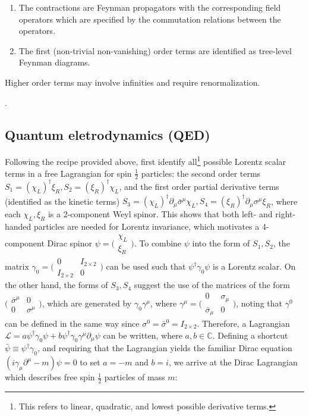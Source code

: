 {\begin{enumerate}
        \item The contractions are Feynman propagators with the
            corresponding field operators which are specified by the commutation
            relations between the operators.

        \item The first (non-trivial non-vanishing) order terms are identified
            as tree-level Feynman diagrams.
    \end{enumerate}
    Higher order terms may involve infinities and require renormalization.
}.


\subsection{Quantum eletrodynamics (QED)}
\label{qed}

Following the recipe provided above, first identify all\footnote{
    This refers to linear, quadratic, and lowest possible derivative terms.
} possible Lorentz scalar
terms in a free Lagrangian for spin $\frac{1}{2}$ particles:
the second order terms
$S_1 = (\chi_L)^\dagger \xi_R, S_2 = (\xi_R)^\dagger\chi_L$,
and the first order partial derivative terms (identified as the kinetic terms)
$S_3 = (\chi_L)^\dagger \partial_\mu \bar{\sigma}^\mu \chi_L,
S_4 = (\xi_R)^\dagger \partial_\mu {\sigma}^\mu \xi_R$,
where each $\chi_L, \xi_R$ is a 2-component Weyl spinor.
This shows that both left- and right-handed particles are needed for Lorentz
invariance,
which motivates a 4-component Dirac spinor
$\psi = \bigl(\begin{smallmatrix} \chi_L \\ \xi_R \end{smallmatrix}\bigr)$.
To combine $\psi$ into the form of $S_1, S_2$,
the matrix
$\gamma_0 = \bigl(\begin{smallmatrix} 0 & I_{2 \times 2} \\ I_{2 \times 2} & 0 \end{smallmatrix}\bigr)$
can be used such that $\psi^\dagger \gamma_0 \psi$ is a Lorentz scalar.
On the other hand,
the forms of $S_3, S_4$ suggest the use of the matrices of the form
$\bigl(\begin{smallmatrix} \bar{\sigma}^\mu & 0 \\ 0 & \sigma^\mu \end{smallmatrix}\bigr)$,
which are generated by $\gamma_0 \gamma^\mu$,
where $\gamma^\mu = \bigl(\begin{smallmatrix} 0 & {\sigma}_\mu \\ \bar{\sigma}_\mu & 0 \end{smallmatrix}\bigr)$,
noting that $\gamma^0$ can be defined in the same way since
$\sigma^0 = \bar{\sigma}^0 = I_{2 \times 2}$.
Therefore, a Lagrangian
$\mathcal{L} = a \psi^\dagger \gamma_0 \psi + b \psi^\dagger \gamma_0 \gamma^\mu \partial_\mu \psi$
can be written, where $a, b \in \mathbb{C}$.
Defining a shortcut $\bar{\psi} \equiv \psi^\dagger \gamma_0$,
and requiring that the Lagrangian yields the familiar Dirac equation
$(i \gamma_\mu \partial^\mu - m)\psi = 0$ to set $a = -m$ and $ b = i$,
we arrive at the Dirac Lagrangian which describes free spin $\frac{1}{2}$
particles of mass $m$:


